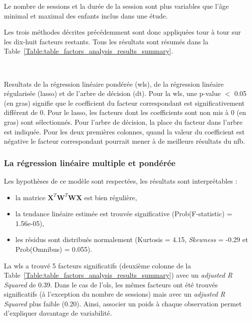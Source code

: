 Le nombre de sessions et la durée de la session sont plus variables que l'âge minimal et maximal des enfants inclus dans une étude. 

Les trois méthodes décrites précédemment sont donc appliquées tour à tour sur les dix-huit facteurs restants. Tous les résultats sont résumés dans la 
Table~\ref{Table:table_factors_analysis_results_summary}.

\newpage\
\begin{table}[h!]
  \centering
  \caption{Resultats de la régression linéaire pondérée (\gls{wls}), de la régression linéaire régularisée (\gls{lasso}) et de l'arbre de décision (\gls{dt}). Pour la \gls{wls}, une p-value $<$ 0.05 
	(en gras) signifie que le coefficient du facteur correspondant est significativement différent de 0. Pour le \gls{lasso}, les facteurs dont les coefficients sont non mis à 0 (en gras) sont 
	sélectionnés. Pour l'arbre de décision, la place du facteur dans l'arbre est indiquée. Pour les deux premières colonnes, quand la valeur du coefficient est négative le facteur 
	correspondant pourrait mener à de meilleurs résultats du \gls{nfb}.}
  
  \label{Table:table_factors_analysis_results_summary}
\end{table}

\subsubsection{La régression linéaire multiple et pondérée}

Les hypothèses de ce modèle sont respectées, les résultats sont interprétables :
\begin{itemize}
	\item la matrice ${\textbf{X}}^{T}\textbf{W}^{T}\textbf{WX}$ est bien régulière,
  \item la tendance linéaire estimée est trouvée significative (Prob(F-statistic) = 1.56e-05),
  \item les résidus sont distribués normalement (Kurtosis = 4.15, \textit{Skewness} = -0.29 et Prob(Omnibus) = 0.055).
\end{itemize}

La \gls{wls} a trouvé 5 facteurs significatifs (deuxième colonne de la Table~\ref{Table:table_factors_analysis_results_summary}) avec un \textit{adjusted R Squared} de 0.39. 
Dans le cas de l'\gls{ols}, les mêmes facteurs ont été trouvés significatifs (à l'exception du nombre de sessions) mais avec un \textit{adjusted R Squared} plus faible (0.20). Ainsi, associer un poids
à chaque observation permet d'expliquer davantage de variabilité. 

